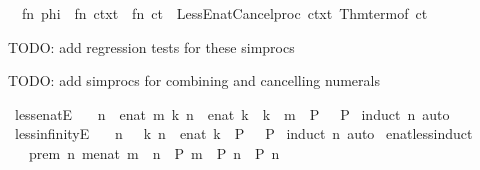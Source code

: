 \begin{isabellebody}
\ \ {\isacartoucheopen}fn\ phi\ {\isacharequal}{\isachargreater}\ fn\ ctxt\ {\isacharequal}{\isachargreater}\ fn\ ct\ {\isacharequal}{\isachargreater}\ Less{\isacharunderscore}Enat{\isacharunderscore}Cancel{\isachardot}proc\ ctxt\ {\isacharparenleft}Thm{\isachardot}term{\isacharunderscore}of\ ct{\isacharparenright}{\isacartoucheclose}%
\endisatagML
{\isafoldML}%
%
\isadelimML
%
\endisadelimML
%
\begin{isamarkuptext}%
TODO: add regression tests for these simprocs%
\end{isamarkuptext}\isamarkuptrue%
%
\begin{isamarkuptext}%
TODO: add simprocs for combining and cancelling numerals%
\end{isamarkuptext}\isamarkuptrue%
%
\isadelimdocument
%
\endisadelimdocument
%
\isatagdocument
%
\isamarkuptrue%
%
\endisatagdocument
{\isafolddocument}%
%
\isadelimdocument
%
\endisadelimdocument
{}\isamarkupfalse%
\ less{\isacharunderscore}enatE{\isacharcolon}\isanewline
\ \ {\isachardoublequoteopen}{\isacharbrackleft}{\isacharbar}\ n\ {\isacharless}\ enat\ m{\isacharsemicolon}\ {\isacharbang}{\isacharbang}k{\isachardot}\ n\ {\isacharequal}\ enat\ k\ {\isacharequal}{\isacharequal}{\isachargreater}\ k\ {\isacharless}\ m\ {\isacharequal}{\isacharequal}{\isachargreater}\ P\ {\isacharbar}{\isacharbrackright}\ {\isacharequal}{\isacharequal}{\isachargreater}\ P{\isachardoublequoteclose}\isanewline
%
\isadelimproof
%
\endisadelimproof
%
\isatagproof
{}\isamarkupfalse%
\ {\isacharparenleft}induct\ n{\isacharparenright}\ auto%
\endisatagproof
{\isafoldproof}%
%
\isadelimproof
\isanewline
%
\endisadelimproof
\isanewline
{}\isamarkupfalse%
\ less{\isacharunderscore}infinityE{\isacharcolon}\isanewline
\ \ {\isachardoublequoteopen}{\isacharbrackleft}{\isacharbar}\ n\ {\isacharless}\ {\isasyminfinity}{\isacharsemicolon}\ {\isacharbang}{\isacharbang}k{\isachardot}\ n\ {\isacharequal}\ enat\ k\ {\isacharequal}{\isacharequal}{\isachargreater}\ P\ {\isacharbar}{\isacharbrackright}\ {\isacharequal}{\isacharequal}{\isachargreater}\ P{\isachardoublequoteclose}\isanewline
%
\isadelimproof
%
\endisadelimproof
%
\isatagproof
{}\isamarkupfalse%
\ {\isacharparenleft}induct\ n{\isacharparenright}\ auto%
\endisatagproof
{\isafoldproof}%
%
\isadelimproof
\isanewline
%
\endisadelimproof
\isanewline
{}\isamarkupfalse%
\ enat{\isacharunderscore}less{\isacharunderscore}induct{\isacharcolon}\isanewline
\ \ \ prem{\isacharcolon}\ {\isachardoublequoteopen}{\isasymAnd}n{\isachardot}\ {\isasymforall}m{\isacharcolon}{\isacharcolon}enat{\isachardot}\ m\ {\isacharless}\ n\ {\isasymlongrightarrow}\ P\ m\ {\isasymLongrightarrow}\ P\ n{\isachardoublequoteclose}\ \ {\isachardoublequoteopen}P\ n{\isachardoublequoteclose}\isanewline

\end{isabellebody}
